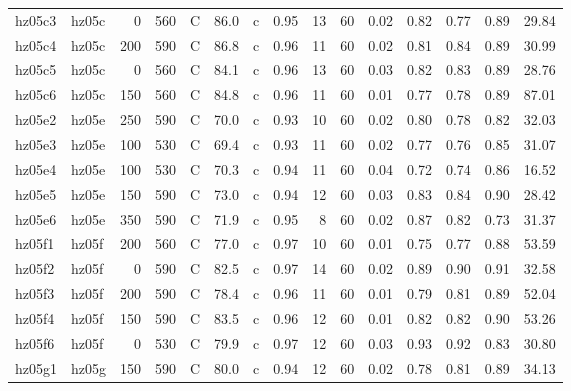 \documentclass{article}
\begin{document}
\begin{landscape}
\begin{longtable}{llrrlrlrrrrrrrr}
      hz05c3 &      hz05c &    0 &  560 &     C &    86.0 &   c &  0.95 &  13 &         60 &  0.02 &  0.82 &  0.77 &  0.89 &   29.84 \\
      hz05c4 &      hz05c &  200 &  590 &     C &    86.8 &   c &  0.96 &  11 &         60 &  0.02 &  0.81 &  0.84 &  0.89 &   30.99 \\
      hz05c5 &      hz05c &    0 &  560 &     C &    84.1 &   c &  0.96 &  13 &         60 &  0.03 &  0.82 &  0.83 &  0.89 &   28.76 \\
      hz05c6 &      hz05c &  150 &  560 &     C &    84.8 &   c &  0.96 &  11 &         60 &  0.01 &  0.77 &  0.78 &  0.89 &   87.01 \\
      hz05e2 &      hz05e &  250 &  590 &     C &    70.0 &   c &  0.93 &  10 &         60 &  0.02 &  0.80 &  0.78 &  0.82 &   32.03 \\
      hz05e3 &      hz05e &  100 &  530 &     C &    69.4 &   c &  0.93 &  11 &         60 &  0.02 &  0.77 &  0.76 &  0.85 &   31.07 \\
      hz05e4 &      hz05e &  100 &  530 &     C &    70.3 &   c &  0.94 &  11 &         60 &  0.04 &  0.72 &  0.74 &  0.86 &   16.52 \\
      hz05e5 &      hz05e &  150 &  590 &     C &    73.0 &   c &  0.94 &  12 &         60 &  0.03 &  0.83 &  0.84 &  0.90 &   28.42 \\
      hz05e6 &      hz05e &  350 &  590 &     C &    71.9 &   c &  0.95 &   8 &         60 &  0.02 &  0.87 &  0.82 &  0.73 &   31.37 \\
      hz05f1 &      hz05f &  200 &  560 &     C &    77.0 &   c &  0.97 &  10 &         60 &  0.01 &  0.75 &  0.77 &  0.88 &   53.59 \\
      hz05f2 &      hz05f &    0 &  590 &     C &    82.5 &   c &  0.97 &  14 &         60 &  0.02 &  0.89 &  0.90 &  0.91 &   32.58 \\
      hz05f3 &      hz05f &  200 &  590 &     C &    78.4 &   c &  0.96 &  11 &         60 &  0.01 &  0.79 &  0.81 &  0.89 &   52.04 \\
      hz05f4 &      hz05f &  150 &  590 &     C &    83.5 &   c &  0.96 &  12 &         60 &  0.01 &  0.82 &  0.82 &  0.90 &   53.26 \\
      hz05f6 &      hz05f &    0 &  530 &     C &    79.9 &   c &  0.97 &  12 &         60 &  0.03 &  0.93 &  0.92 &  0.83 &   30.80 \\
      hz05g1 &      hz05g &  150 &  590 &     C &    80.0 &   c &  0.94 &  12 &         60 &  0.02 &  0.78 &  0.81 &  0.89 &   34.13 \\

\end{longtable}
\end{landscape}
\end{document}
